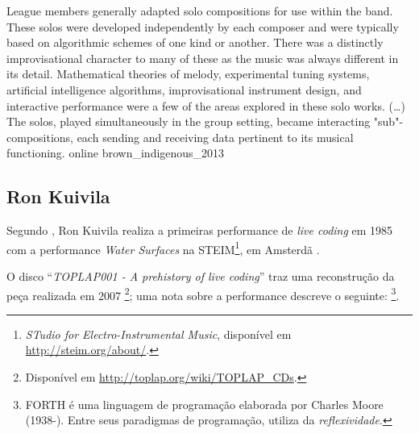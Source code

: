 {League members generally adapted solo compositions for use within the band. These solos were developed independently by each composer and were typically based on algorithmic schemes of one kind or another. There was a distinctly improvisational character to many of these as the music was always different in its detail. Mathematical theories of melody, experimental tuning systems, artificial intelligence algorithms, improvisational instrument design, and interactive performance were a few of the areas explored in these solo works. (\ldots) The solos, played simultaneously in the group setting, became interacting "sub"-compositions, each sending and receiving data pertinent to its musical functioning.}
{online}
{brown_indigenous_2013}


\subsection{Ron Kuivila}

Segundo , Ron Kuivila realiza a primeiras performance de \emph{live coding} em 1985 com a performance \emph{Water Surfaces} na STEIM\footnote{\emph{STudio for Electro-Instrumental Music}, disponível em \url{http://steim.org/about/}.}, em Amsterdã \cite{blackwell_programming_2005}. 

O disco ``\emph{TOPLAP001 - A prehistory of live coding}'' traz uma reconstrução da peça realizada em 2007 \footnote{Disponível em \url{http://toplap.org/wiki/TOPLAP_CDs}.}; uma nota sobre a performance descreve o seguinte: \footnote{FORTH é uma linguagem de programação elaborada por Charles Moore (1938-). Entre seus paradigmas de programação, utiliza da \emph{reflexividade}.}. 

